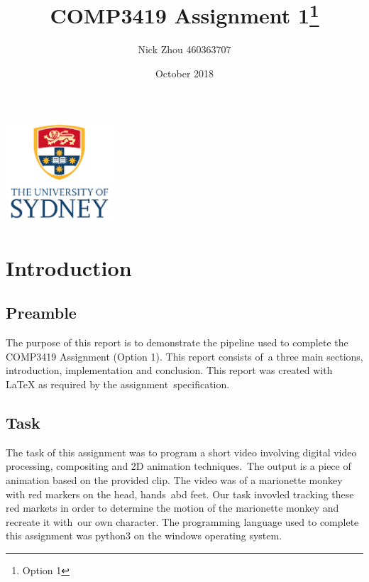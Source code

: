 \documentclass[12pt,a4paper]{article}
\begin{document}
    \begin{titlepage}
        \centering
        \title{COMP3419 Assignment 1\thanks{Option 1}}
        \author{Nick Zhou 460363707}
        \date{October 2018}
        \maketitle
        \centering
        \includegraphics[width=4cm]{usyd}\\[2cm]
    \end{titlepage}

    \begin{tableofcontents}
        \tableofcontents
    \end{tableofcontents}

    \section{Introduction}

      \subsection{Preamble}

      The purpose of this report is to demonstrate the pipeline used to complete the COMP3419 Assignment (Option 1). This report consists of\
      a three main sections, introduction, implementation and conclusion. This report was created with \LaTeX{} as required by the assignment\
      specification.\\

      \subsection{Task}

      The task of this assignment was to program a short video involving digital video processing, compositing and 2D animation techniques.\
      The output is a piece of animation based on the provided clip. The video was of a marionette monkey with red markers on the head, hands\
      abd feet. Our task invovled tracking these red markets in order to determine the motion of the marionette monkey and recreate it with\
      our own character. The programming language used to complete this assignment was python3 on the windows operating system.\\
\end{document}

